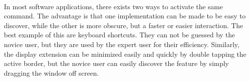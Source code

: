 \hfill\\
In most software applications, there exists two ways to activate the same command.
The advantage is that one implementation can be made to be easy to discover, while the other is more obscure, but a faster or easier interaction.
The best example of this are keyboard shortcuts. They can not be guessed by the novice user, but they are used by the expert user for their efficiency.
Similarly, the display extension can be minimized easily and quickly by double tapping the active border, but the novice user can easily discover the feature by simply dragging the window off screen.
